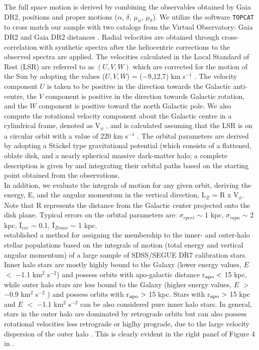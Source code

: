 The full space motion is derived by combining the observables obtained by Gaia DR2, positions and proper motions ($\alpha$, $\delta$, $\mu_{\alpha}$, $\mu_{\delta}$). We utilize the software {\tt TOPCAT} to cross match our sample with two catalogs from the Virtual Observatory: Gaia DR2 \citep[][for proper motions]{2018A&A...616A...1G} and Gaia DR2 distances \citep[][for distances]{2018AJ....156...58B}. Radial velocities are obtained through cross-correlation with synthetic spectra after the heliocentric corrections to the observed spectra are applied.
The velocities calculated in the Local Standard of Rest (LSR) are referred to as $(U, V, W)$ which are corrected for the motion of the Sun by adopting the values ($U, V, W$) = ($-$9,12,7) km s$^{-1}$ \citep{1981Sci...214..829M}. The velocity component $U$ is taken to be positive in the direction towards the Galactic anti-centre, the $V$ component is positive in the direction towards Galactic rotation, and the $W$ component is positive toward the north Galactic pole. We also compute the rotational velocity component about the Galactic centre in a cylindrical frame, denoted as V$_{\phi}$ , and is calculated assuming  that the LSR is on a circular orbit with a value of 220 km s$^{-1}$ \citep{1986MNRAS.221.1023K}. The orbital parameters are derived by adopting a St\"{a}ckel type gravitational potential (which consists of a flattened, oblate disk, and a nearly spherical massive dark-matter halo; a complete description is given by \citet[][Appendix A]{2000AJ....119.2843C} and integrating their orbital paths based on the starting point obtained from the observations. \\ In addition, we evaluate the integrals of motion for any given orbit, deriving the energy, E, and the angular momentum in the vertical direction, L$_{Z}$ = R x V$_{\phi}$. Note that R represents the distance from the Galactic center projected onto the disk plane. Typical errors on the orbital parameters \citep[at Zmax $<$ 50 kpc;][]{2010ApJ...712..692C} are: $\sigma$$_{rperi}$ $\sim$ 1 kpc, $\sigma$$_{rapo}$ $\sim$ 2 kpc, Ï$_{ecc}$ $\sim$ 0.1, Ï$_{Zmax}$ $\sim$ 1 kpc. \\
\citet{2014ApJ...788..180C} established a method for assigning the membership to the inner- and outer-halo stellar populations based on the integrals of motion (total energy and vertical angular momentum) of a large sample of SDSS/SEGUE DR7 calibration stars. Inner halo stars are mostly highly bound to the Galaxy (lower energy values, $E$ $<$ $-$1.1 km$^{2}$ s$^{-2}$) and possess orbits with apo-galactic distance r$_{\rm apo} <$ 15 kpc, while outer halo stars are less bound to the Galaxy (higher energy values, $E$ $>$ $-$0.9 km$^{2}$ s$^{-2}$ ) and possess orbits with r$_{\rm apo} >$ 15 kpc. Stars with r$_{\rm apo} >$ 15 kpc and $E$ $<$ $-$1.1 km$^{2}$ s$^{-2}$ can be also considered pure inner halo stars. In general, stars in the outer halo are dominated by retrograde orbits but can also possess rotational velocities less retrograde or higlhy prograde, due to the large velocity dispersion  of the outer halo \citep[$\sim$ 165 km s$^{-1}$;][]{2010ApJ...712..692C}. This is clearly evident in the right panel of Figure 4 in \citep{2014ApJ...788..180C} . \\
